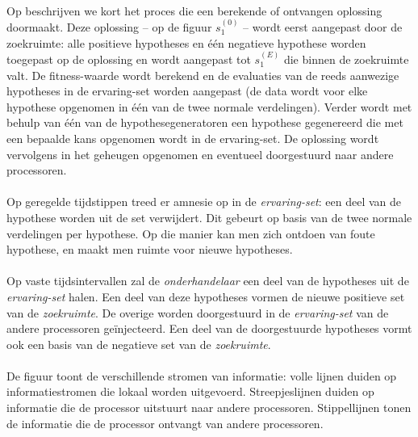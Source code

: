 \paragraph{}
Op  beschrijven we kort het proces die een berekende of ontvangen oplossing doormaakt. Deze oplossing -- op de figuur $s_1^{(0)}$ -- wordt eerst aangepast door de zoekruimte: alle positieve hypotheses en \'e\'en negatieve hypothese worden toegepast op de oplossing en wordt aangepast tot $s_1^{(E)}$ die binnen de zoekruimte valt. De fitness-waarde wordt berekend en de evaluaties van de reeds aanwezige hypotheses in de ervaring-set worden aangepast (de data wordt voor elke hypothese opgenomen in \'e\'en van de twee normale verdelingen). Verder wordt met behulp van \'e\'en van de hypothesegeneratoren  een hypothese gegenereerd die met een bepaalde kans opgenomen wordt in de ervaring-set. De oplossing wordt vervolgens in het geheugen opgenomen en eventueel doorgestuurd naar andere processoren.

\paragraph{}
Op geregelde tijdstippen treed er amnesie op in de \emph{ervaring-set}: een deel van de hypothese worden uit de set verwijdert. Dit gebeurt op basis van de twee normale verdelingen per hypothese. Op die manier kan men zich ontdoen van foute hypothese, en maakt men ruimte voor nieuwe hypotheses.

\paragraph{}
Op vaste tijdsintervallen zal de \emph{onderhandelaar} een deel van de hypotheses uit de \emph{ervaring-set} halen. Een deel van deze hypotheses vormen de nieuwe positieve set van de \emph{zoekruimte}. De overige worden doorgestuurd in de \emph{ervaring-set} van de andere processoren ge\"injecteerd. Een deel van de doorgestuurde hypotheses vormt ook een basis van de negatieve set van de \emph{zoekruimte}.

\paragraph{}
De figuur toont de verschillende stromen van informatie: volle lijnen duiden op informatiestromen die lokaal worden uitgevoerd. Streepjeslijnen duiden op informatie die de processor uitstuurt naar andere processoren. Stippellijnen tonen de informatie die de processor ontvangt van andere processoren.